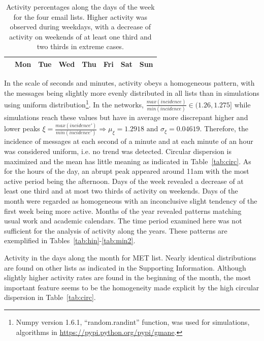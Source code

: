 \documentclass[%
	aip,
	jmp,%
	amsmath,amssymb,
	reprint,%
]{revtex4-1}
\begin{document}
\begin{table}
	\caption{Activity percentages along the days of the week for the four email lists. Higher activity was observed during weekdays, with a decrease of activity on weekends of at least one third and two thirds in extreme cases.}
	\begin{center}
		\begin{tabular}{ | l |  c | c | c | c | c |   c | c |}
			\hline
			& Mon & Tue & Wed & Thu & Fri & Sat & Sun  \\ \hline
			
		\end{tabular}
	\end{center}
	\label{tab:win}
\end{table}
In the scale of seconds and minutes, activity obeys a homogeneous pattern, with the messages being slightly more evenly distributed in all lists than in simulations using uniform distribution\footnote{Numpy version 1.6.1, ``random.randint'' function, was used for simulations, algorithms in \url{https://pypi.python.org/pypi/gmane}.}. In the networks, $\frac{max(incidence)}{min(incidence)} \in (1.26,1.275]$ while simulations reach these values but have in average more discrepant higher and lower peaks $\xi=\frac{max(incidence')}{min(incidence')} \Rightarrow \mu_\xi=1.2918 \text{ and } \sigma_\xi=0.04619$.
Therefore, the incidence of messages at each second of a minute and at each minute of an hour was considered uniform, i.e. no trend was detected. Circular dispersion is maximized and the mean has little meaning as indicated in Table~\ref{tab:circ}. As for the hours of the day, an abrupt peak appeared around 11am with the most active period being the afternoon. Days of the week revealed a decrease of at least one third and at most two thirds of activity on weekends. Days of the month were regarded as homogeneous with an inconclusive slight tendency of the first week being more active. Months of the year revealed patterns matching usual work and academic calendars. The time period examined here was not sufficient for the analysis of activity along the years. These patterns are exemplified in Tables~\ref{tab:hin}-\ref{tab:min2}.


\FloatBarrier

\begin{table}
	\caption{Activity in the days along the month for MET list. Nearly identical distributions are found on other lists as indicated in the Supporting Information. Although slightly higher activity rates are found in the beginning of the month, the most important feature seems to be the homogeneity made explicit by the high circular dispersion in Table~\ref{tab:circ}.}
	\footnotesize
	
	\label{tab:min}
\end{table}
\end{document}
